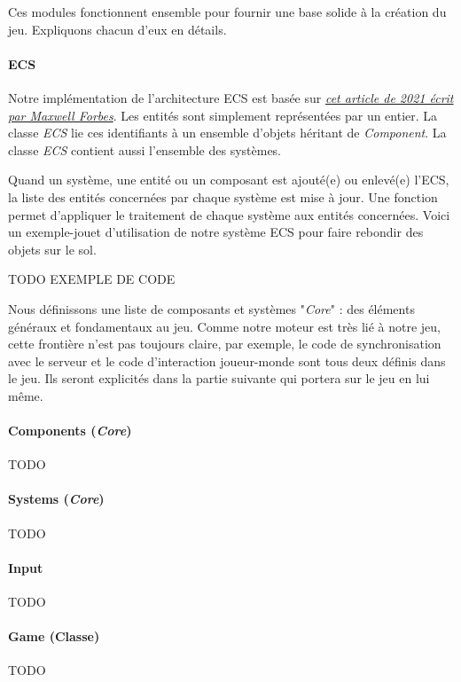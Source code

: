    Ces modules fonctionnent ensemble pour fournir une base solide à la création du jeu. Expliquons chacun d'eux en détails.
\paragraph{ECS}
    Notre implémentation de l'architecture ECS est basée sur \href{https://maxwellforbes.com/posts/typescript-ecs-implementation/}{\textit{cet article de 2021 écrit par Maxwell Forbes}}. Les entités sont simplement représentées par un entier. La classe \textit{ECS} lie ces identifiants à un ensemble d'objets héritant de \textit{Component}. La classe \textit{ECS} contient aussi l'ensemble des systèmes.
    
    Quand un système, une entité ou un composant est ajouté(e) ou enlevé(e) l'ECS, la liste des entités concernées par chaque système est mise à jour.
    Une fonction permet d'appliquer le traitement de chaque système aux entités concernées. Voici un exemple-jouet d'utilisation de notre système ECS pour faire rebondir des objets sur le sol.

    TODO EXEMPLE DE CODE


    Nous définissons une liste de composants et systèmes "\textit{Core}" : des éléments généraux et fondamentaux au jeu. Comme notre moteur est très lié à notre jeu, cette frontière n'est pas toujours claire, par exemple, le code de synchronisation avec le serveur et le code d’interaction joueur-monde sont tous deux définis dans le jeu. Ils seront explicités dans la partie suivante qui portera sur le jeu en lui même.
\paragraph{Components (\textit{Core})}
    TODO


\paragraph{Systems (\textit{Core})}
    TODO




\paragraph{Input}
    TODO
    


\paragraph{Game (Classe)}
    TODO